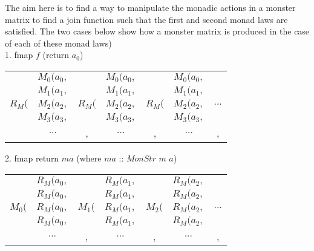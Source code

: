\documentclass{article}
\begin{document}
	
The aim here is to find a way to manipulate the monadic actions in a monster matrix to find a join function such that the first and second monad laws are satisfied. The two cases below show how a monster matrix is produced in the case of each of these monad laws)\\
\vspace{1cm}
1. fmap $f$ (return $a_0$)
\begin{center}
\begin{tabular}{c c c c c c c}
	     & $M_0 (a_0,$  &       &$M_0 (a_0,$  &       &$M_0 (a_0,$\\
	     & $M_1 (a_1,$  &       &$M_1 (a_1,$  &       &$M_1 (a_1,$\\
  $R_M ($& $M_2 (a_2,$  &$R_M ($&$M_2 (a_2,$  &$R_M ($&$M_2 (a_2,$ & $...$\\
		 & $M_3 (a_3,$  &       &$M_3 (a_3,$  &       &$M_3 (a_3,$\\
		 & $...$  &,       &$...$  &,       &$...$ &, \\
\end{tabular}
\end{center}
\vspace{1cm}
2. fmap return $ma$ (where $ma$ :: $MonStr$ $m$ $a$)
\begin{center}
\begin{tabular}{c c c c c c c}
	     & $R_M (a_0,$  &       &$R_M (a_1,$  &       &$R_M (a_2,$\\
	     & $R_M (a_0,$  &       &$R_M (a_1,$  &       &$R_M (a_2,$\\
  $M_0 ($& $R_M (a_0,$  &$M_1 ($&$R_M (a_1,$  &$M_2 ($&$R_M (a_2,$ & $...$\\
		 & $R_M (a_0,$  &       &$R_M (a_1,$  &       &$R_M (a_2,$\\
		 & $...$  &,       &$...$  &,       &$...$ &, \\
\end{tabular}
\end{center}
\end{document}
